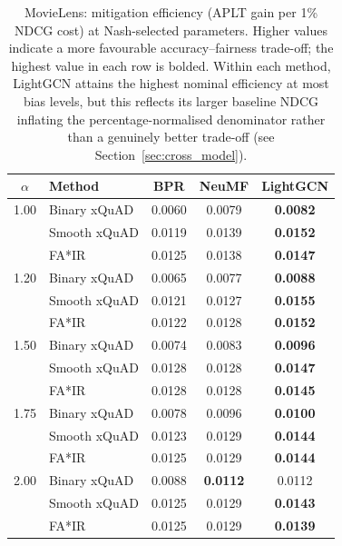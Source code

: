 \begin{table}[htbp]
\centering
\caption{MovieLens: mitigation efficiency (APLT gain per 1\% NDCG cost) at Nash-selected parameters. Higher values indicate a more favourable accuracy--fairness trade-off; the highest value in each row is bolded. Within each method, LightGCN attains the highest nominal efficiency at most bias levels, but this reflects its larger baseline NDCG inflating the percentage-normalised denominator rather than a genuinely better trade-off (see Section~\ref{sec:cross_model}).}
\label{tab:efficiency_ml}
\begin{tabular}{clccc}
\toprule
$\alpha$ & Method & BPR & NeuMF & LightGCN \\
\midrule
1.00 & Binary xQuAD & 0.0060 & 0.0079 & \textbf{0.0082} \\
\rowcolor{gray!6}  & Smooth xQuAD & 0.0119 & 0.0139 & \textbf{0.0152} \\
 & FA*IR & 0.0125 & 0.0138 & \textbf{0.0147} \\
\midrule
1.20 & Binary xQuAD & 0.0065 & 0.0077 & \textbf{0.0088} \\
\rowcolor{gray!6}  & Smooth xQuAD & 0.0121 & 0.0127 & \textbf{0.0155} \\
 & FA*IR & 0.0122 & 0.0128 & \textbf{0.0152} \\
\midrule
1.50 & Binary xQuAD & 0.0074 & 0.0083 & \textbf{0.0096} \\
\rowcolor{gray!6}  & Smooth xQuAD & 0.0128 & 0.0128 & \textbf{0.0147} \\
 & FA*IR & 0.0128 & 0.0128 & \textbf{0.0145} \\
\midrule
1.75 & Binary xQuAD & 0.0078 & 0.0096 & \textbf{0.0100} \\
\rowcolor{gray!6}  & Smooth xQuAD & 0.0123 & 0.0129 & \textbf{0.0144} \\
 & FA*IR & 0.0125 & 0.0129 & \textbf{0.0144} \\
\midrule
2.00 & Binary xQuAD & 0.0088 & \textbf{0.0112} & 0.0112 \\
\rowcolor{gray!6}  & Smooth xQuAD & 0.0125 & 0.0129 & \textbf{0.0143} \\
 & FA*IR & 0.0125 & 0.0129 & \textbf{0.0139} \\
\bottomrule
\end{tabular}
\end{table}